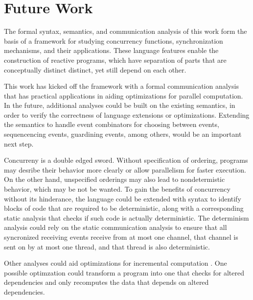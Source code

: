 \documentclass[10pt]{article}
\begin{document}
\section{Future Work}
The formal syntax, semantics, and communication analysis of this work form the basis of
a framework for studying concurrency functions, synchronization mechanisms, and their
applications. These language features enable the construction of reactive programs, which
have separation of parts that are conceptually distinct distinct, yet still depend on each
other.

This work has kicked off the framework with a formal communication analysis that has practical
applications in aiding optimizations for parallel computation.  In the future, additional
analyses could be built on the existing semantics, in order to verify the correctness of language 
extensions or optimizations. Extending the semantics to handle event combinators for choosing
between events, sequencencing events, guardining events, among others, would be an important
next step.

Concurreny is a double edged sword. Without specification of ordering, programs may
desribe their behavior more clearly or allow parallelism for faster execution. On the other hand,
unspecified orderings may also lead to nondetermistic behavior, which may be not be wanted. 
To gain the benefits of concurrency without its hinderance, the language could be extended
with syntax to identify blocks of code that are required to be deterministic,
along with a corresponding static analysis that checks if such code is actually
deterministic. The determinism analysis could rely on the static communication analysis
to ensure that all syncronized receiving events receive from at most one channel,
that channel is sent on by at most one thread, and that thread is also deterministic.

Other analyses could aid optimizations for incremental computation
\cite{acar2009self}.  One possible optimzation could transform a program into one
that checks for altered dependencies and only recomputes the data that depends on altered dependencies.




\end{document}

